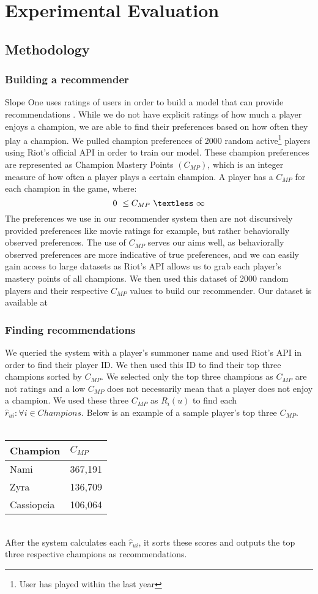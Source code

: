 \documentclass [11pt]{IEEEtran}
\begin{document}
\section{Experimental Evaluation}
\subsection{Methodology}
\subsubsection{Building a recommender}
Slope One uses ratings of users in order to build a model that can provide recommendations \cite{Lemire_2005}. While we do not have explicit ratings of how much a player enjoys a champion, we are able to find their preferences based on how often they play a champion. We pulled champion preferences of 2000 random active\footnote{User has played within the last year} players using Riot’s official API \cite{riotapi} in order to train our model. These champion preferences are represented as Champion Mastery Points $(C_{MP})$, which is an integer measure of how often a player plays a certain champion. A player has a $C_{MP}$ for each champion in the game, where: 
$$
0 \ \leq C_{MP} \ \textless \ \infty
$$
The preferences we use in our recommender system then are not discursively provided preferences like movie ratings for example, but rather behaviorally observed preferences. The use of $C_{MP}$ serves our aims well, as behaviorally observed preferences are more indicative of true preferences, and we can easily gain access to large datasets as Riot's API \cite{riotapi} allows us to grab each player's mastery points of all champions. We then used this dataset of 2000 random players and their respective $C_{MP}$ values to build our recommender. Our dataset is available at \cite{nothereyet}
\subsubsection{Finding recommendations}
We queried the system with a player's summoner name and used Riot's API in order to find their player ID. We then used this ID to find their top three champions sorted by $C_{MP}$. We selected only the top three champions as $C_{MP}$ are not ratings and a low $C_{MP}$ does not necessarily mean that a player does not enjoy a champion. We used these three $C_{MP}$ as $R_i(u)$ to find each $\hat{r}_{ui} : \forall i \in Champions$. Below is an example of a sample player's top three $C_{MP}$. \\\\
\begin{tabular}{| l | l |}
    \hline
    Champion & $C_{MP}$ \\ \hline
    Nami & 367,191  \\ 
    Zyra & 136,709 \\
    Cassiopeia & 106,064 \\
    \hline
\end{tabular}
\vspace{.2cm} \\ \noindent
After the system calculates each $\hat{r}_{ui}$, it sorts these scores and outputs the top three respective champions as recommendations. 
\end{document}
